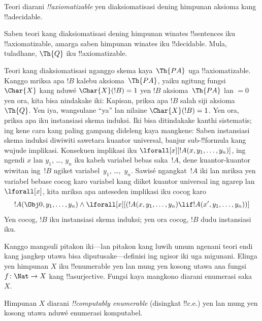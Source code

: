 \documentclass[../../../include/open-logic-section]{subfiles}
\begin{document}
\begin{defn}
Teori diarani \emph{!!{axiomatizable}}
yen diaksiomatisasi dening himpunan
aksioma kang !!a{decidable}.
\end{defn}

\begin{ex}
Saben teori kang diaksiomatisasi dening himpunan
winates !!{sentence}s iku !!{axiomatizable},
amarga saben himpunan winates iku !!{decidable}.
Mula, tuladhane, $\Th{Q}$ iku !!{axiomatizable}.

Teori kang diaksiomatisasi nganggo skema kaya~$\Th{PA}$
uga !!{axiomatizable}. Kanggo mriksa apa $!B$
kalebu aksioma~$\Th{PA}$, yaiku ngitung
fungsi $\Char{X}$ kang nduwé
$\Char{X}(!B) = 1$ yen $!B$ aksioma~$\Th{PA}$
lan $= 0$ yen ora, kita bisa nindakake iki:
Kapisan, priksa apa $!B$ salah siji aksioma~$\Th{Q}$.
Yen iya, wangsulane ``ya'' lan nilaine
$\Char{X}(!B) = 1$. Yen ora, priksa apa iku
instansiasi skema induksi. Iki bisa ditindakake
kanthi sistematis; ing kene cara kang paling
gampang dideleng kaya mangkene: Saben instansiasi
skema induksi diwiwiti sawetara kuantor universal,
banjur sub-!!{formula} kang wujude implikasi.
Konsekuen implikasi iku
$\lforall[x][!A(x, y_1, \dots, y_n)]$, ing ngendi
$x$ lan $y_1$, \dots, $y_n$ iku kabeh variabel
bebas saka~$!A$, dene kuantor-kuantor wiwitan
ing~$!B$ ngiket variabel~$y_1$, \dots,~$y_n$.
Sawisé ngangkat~$!A$ iki lan mriksa yen variabel
bebase cocog karo variabel kang diiket kuantor
universal ing ngarep lan~$\lforall[x]$,
kita mriksa apa anteseden implikasi iku cocog karo
\[
!A(\Obj 0, y_1, \dots, y_n) \land \lforall[x][(!A(x, y_1, \dots, y_n)
\lif !A(x', y_1, \dots, y_n))]
\]
Yen cocog, $!B$ iku instansiasi skema induksi;
yen ora cocog, $!B$ dudu instansiasi iku.
\end{ex}

Kanggo mangsuli pitakon iki---lan pitakon
kang luwih umum ngenani teori endi kang jangkep
utawa bisa diputusake---definisi ing ngisor iki
uga migunani. Elinga yen himpunan $X$ iku
!!{enumerable} yen lan mung yen kosong utawa
ana fungsi~$f \colon \Nat \to X$ kang
!!a{surjective}. Fungsi kaya mangkono diarani
enumerasi saka~$X$.

\begin{defn}
Himpunan $X$ diarani \emph{!!{computably enumerable}}
(disingkat !!{c.e.}) yen lan mung yen kosong
utawa nduwé enumerasi komputabel.
\end{defn}
\end{document}
